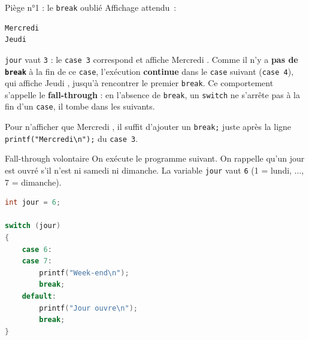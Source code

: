 \begin{UPSTIprofOnlyEnv}
    \begin{UPSTIcorrectionP}{Piège n°1 : le \texttt{break} oublié}
        Affichage attendu~:
        \begin{lstlisting}[language=bash,style=console]
Mercredi
Jeudi
        \end{lstlisting}
        \texttt{jour} vaut \texttt{3} : le \texttt{case 3} correspond et affiche \og Mercredi \fg. Comme il n'y a \textbf{pas de \texttt{break}} à la fin de ce \texttt{case}, l'exécution \textbf{continue} dans le \texttt{case} suivant (\texttt{case 4}), qui affiche \og Jeudi \fg, jusqu'à rencontrer le premier \texttt{break}. Ce comportement s'appelle le \textbf{fall-through} : en l'absence de \texttt{break}, un \texttt{switch} ne s'arrête pas à la fin d'un \texttt{case}, il \og tombe \fg dans les suivants.

        Pour n'afficher que \og Mercredi \fg, il suffit d'ajouter un \texttt{break;} juste après la ligne \texttt{printf("Mercredi\textbackslash n");} du \texttt{case 3}.
    \end{UPSTIcorrectionP}
\end{UPSTIprofOnlyEnv}

\pagebreak
\begin{UPSTIexercice}{Fall-through volontaire}
    On exécute le programme suivant. On rappelle qu'un jour est \og ouvré \fg s'il n'est ni samedi ni dimanche. La variable \texttt{jour} vaut \texttt{6} (1 = lundi, ..., 7 = dimanche).
    \begin{lstlisting}[language=c]
int jour = 6;

switch (jour)
{
    case 6:
    case 7:
        printf("Week-end\n");
        break;
    default:
        printf("Jour ouvre\n");
        break;
}
    \end{lstlisting}
\end{UPSTIexercice}

